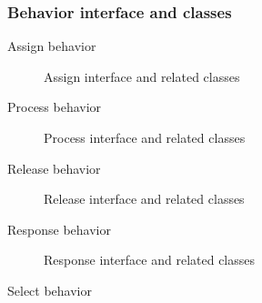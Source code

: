 \subsubsection{Behavior interface and classes}
\begin{asparaenum}
\item Assign behavior
\begin{figure}[htbp]
    \centering
    \scriptsize
    \begin{tikzpicture}
    
    
    
    \end{tikzpicture}
    \caption{Assign interface and related classes}
    \label{fig:assigninterface}
\end{figure}

\item Process behavior

\begin{figure}[htbp]
    \centering
    \scriptsize
    \begin{tikzpicture}
    
    
    
    \end{tikzpicture}
    \caption{Process interface and related classes}
    \label{fig:processinterface}
\end{figure}
\item Release behavior

\begin{figure}[htbp]
    \centering
    \scriptsize
    \begin{tikzpicture}
    
    
    
    \end{tikzpicture}
    \caption{Release interface and related classes}
    \label{fig:releaseinterface}
\end{figure}
\item Response behavior

\begin{figure}[htbp]
    \centering
    \scriptsize
    \begin{tikzpicture}
    
    
    
    \end{tikzpicture}
    \caption{Response interface and related classes}
    \label{fig:reponseinterface}
\end{figure}
\item Select behavior
\end{asparaenum}

